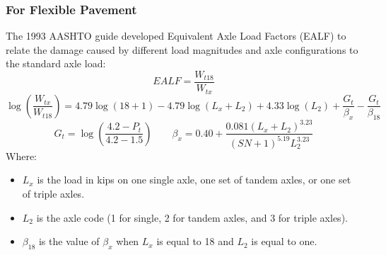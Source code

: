 \subsubsection{For Flexible Pavement}
The 1993 AASHTO guide developed Equivalent Axle Load Factors (EALF) to relate the damage
caused by different load magnitudes and axle configurations to the standard axle load:
\begin{equation*}
    EALF = \frac{W_{t18}}{W_{tx}}
\end{equation*}
\begin{equation}
    \log\left(\frac{W_{tx}}{W_{t18}}\right) = 4.79\log(18+1) - 4.79\log(L_x + L_2)
    + 4.33\log(L_2) + \frac{G_t}{\beta_x} - \frac{G_t}{\beta_{18}}
\label{eq:ealf_flexible}
\end{equation}
\begin{equation*}
    G_t = \log\left(\frac{4.2 - P_t}{4.2 - 1.5}\right) \qquad
    \beta_x = 0.40 + \frac{0.081(L_x + L_2)^{3.23}}{(SN + 1)^{5.19} L_2^{3.23}}
\end{equation*}
Where:
\begin{itemize}
    \item $L_x$ is the load in kips on one single axle, one set of tandem axles, or one set of triple axles.
    \item $L_2$ is the axle code (1 for single, 2 for tandem axles, and 3 for triple axles).
    \item $\beta_{18}$ is the value of $\beta_x$ when $L_x$ is equal to 18 and $L_2$ is equal to one.
\end{itemize}


